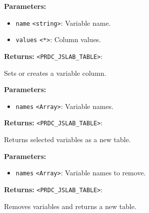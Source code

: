 \documentclass[12pt,a4paper]{article}
\begin{document}
\vspace{5mm}
\noindent {}


\noindent \textbf{Parameters:}
\begin{itemize}
  \item \texttt{name} \texttt{<string>}: Variable name.
  \item \texttt{values} \texttt{<*>}: Column values.
\end{itemize}

\noindent \textbf{Returns:} \texttt{<PRDC\_JSLAB\_TABLE>}:

\noindent Sets or creates a variable column.

\vspace{5mm}
\noindent {}


\noindent \textbf{Parameters:}
\begin{itemize}
  \item \texttt{names} \texttt{<Array>}: Variable names.
\end{itemize}

\noindent \textbf{Returns:} \texttt{<PRDC\_JSLAB\_TABLE>}:

\noindent Returns selected variables as a new table.

\vspace{5mm}
\noindent {}


\noindent \textbf{Parameters:}
\begin{itemize}
  \item \texttt{names} \texttt{<Array>}: Variable names to remove.
\end{itemize}

\noindent \textbf{Returns:} \texttt{<PRDC\_JSLAB\_TABLE>}:

\noindent Removes variables and returns a new table.

\vspace{5mm}
\noindent {}
\end{document}
